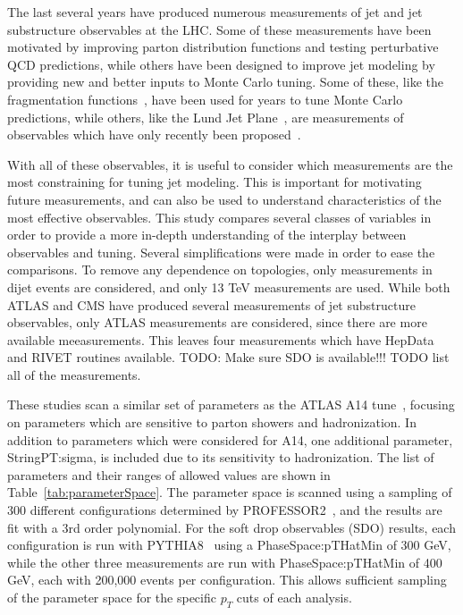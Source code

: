 

The last several years have produced numerous measurements of jet and jet substructure observables at the LHC. 
Some of these measurements have been motivated by improving parton distribution functions and testing perturbative QCD predictions, 
while others have been designed to improve jet modeling by providing new and better inputs to Monte Carlo tuning.
Some of these, like the fragmentation functions~\cite{Aad:2019onw}, have been used for years to tune Monte Carlo predictions, 
while others, like the Lund Jet Plane~\cite{lundAtlas}, are measurements of observables which have only recently been proposed~\cite{lundPlane}.

With all of these observables, it is useful to consider which measurements are the most constraining for tuning jet modeling.
This is important for motivating future measurements, and can also be used to understand characteristics of the most effective observables.
This study compares several classes of variables in order to provide a more in-depth understanding of the interplay between observables and tuning.
Several simplifications were made in order to ease the comparisons. 
To remove any dependence on topologies, only measurements in dijet events are considered, and only 13 TeV measurements are used.
While both ATLAS and CMS have produced several measurements of jet substructure observables, only ATLAS measurements are considered, since there are more available meeasurements.
This leaves four measurements which have HepData and RIVET routines available.
TODO: Make sure SDO is available!!!
TODO list all of the measurements.


These studies scan a similar set of parameters as the ATLAS A14 tune~\cite{ATL-PHYS-PUB-2014-021}, focusing on parameters which are sensitive to parton showers and hadronization.
In addition to parameters which were considered for A14, one additional parameter, StringPT:sigma, is included due to its sensitivity to hadronization.
The list of parameters and their ranges of allowed values are shown in Table~\ref{tab:parameterSpace}.
The parameter space is scanned using a sampling of 300 different configurations determined by PROFESSOR2~\cite{professor}, and the results are fit with a 3rd order polynomial.
For the soft drop observables (SDO) results, each configuration is run with PYTHIA8~\cite{pythia} using a PhaseSpace:pTHatMin of 300 GeV, 
while the other three measurements are run with PhaseSpace:pTHatMin of 400 GeV, each with 200,000 events per configuration. 
This allows sufficient sampling of the parameter space for the specific $p_{T}$ cuts of each analysis. 


